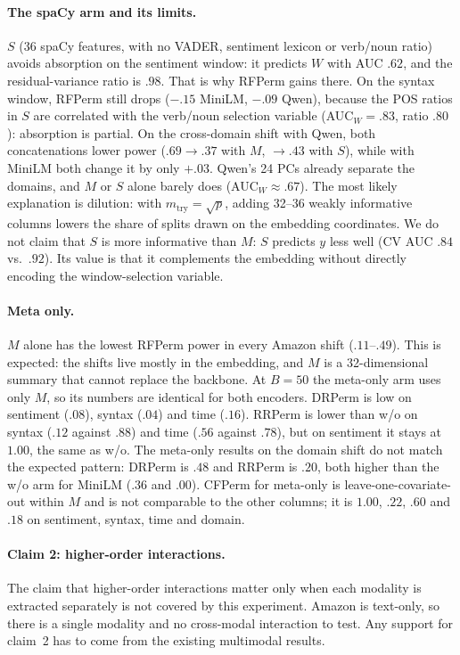 \paragraph{The spaCy arm and its limits.}
$S$ (36 spaCy features, with no VADER, sentiment lexicon or verb/noun ratio) avoids absorption on the
sentiment window: it predicts $W$ with AUC $.62$, and the residual-variance ratio is $.98$.
That is why RFPerm gains there.
On the syntax window, RFPerm still drops ($-.15$ MiniLM, $-.09$ Qwen), because the POS ratios in $S$
are correlated with the verb/noun selection variable (AUC$_W=.83$, ratio $.80$): absorption is partial.
On the cross-domain shift with Qwen, both concatenations lower power
($.69\to.37$ with $M$, $\to.43$ with $S$), while with MiniLM both change it by only $+.03$.
Qwen's 24 PCs already separate the domains, and $M$ or $S$ alone barely does (AUC$_W\approx.67$).
The most likely explanation is dilution: with $m_{\mathrm{try}}=\sqrt p$, adding 32--36 weakly
informative columns lowers the share of splits drawn on the embedding coordinates.
We do not claim that $S$ is more informative than $M$: $S$ predicts $y$ less well
(CV AUC $.84$ vs.\ $.92$).
Its value is that it complements the embedding without directly encoding the window-selection variable.

\paragraph{Meta only.}
$M$ alone has the lowest RFPerm power in every Amazon shift ($.11$--$.49$).
This is expected: the shifts live mostly in the embedding, and $M$ is a 32-dimensional summary that
cannot replace the backbone.
At $B{=}50$ the meta-only arm uses only $M$, so its numbers are identical for both encoders.
DRPerm is low on sentiment ($.08$), syntax ($.04$) and time ($.16$).
RRPerm is lower than w/o on syntax ($.12$ against $.88$) and time ($.56$ against $.78$), but on sentiment it
stays at $1.00$, the same as w/o.
The meta-only results on the domain shift do not match the expected pattern: DRPerm is $.48$ and RRPerm
is $.20$, both higher than the w/o arm for MiniLM ($.36$ and $.00$).
CFPerm for meta-only is leave-one-covariate-out within $M$ and is not comparable to the other columns;
it is $1.00$, $.22$, $.60$ and $.18$ on sentiment, syntax, time and domain.

\paragraph{Claim 2: higher-order interactions.}
The claim that higher-order interactions matter only when each modality is extracted separately
is not covered by this experiment.
Amazon is text-only, so there is a single modality and no cross-modal interaction to test.
Any support for claim~2 has to come from the existing multimodal results.

